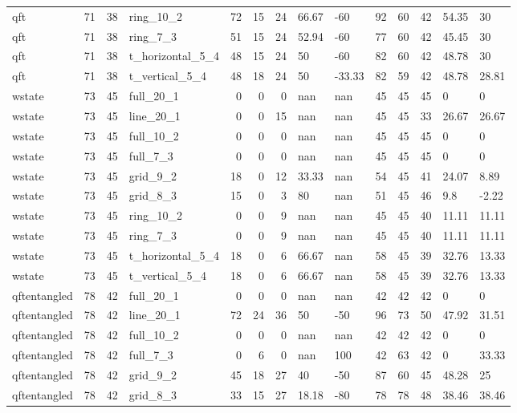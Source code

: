 \begin{longtable}{lrrlrrrllrrrll}
qft & 71 & 38 & ring\_10\_2 & 72 & 15 & 24 & 66.67 & -60 & 92 & 60 & 42 & 54.35 & 30 \\
qft & 71 & 38 & ring\_7\_3 & 51 & 15 & 24 & 52.94 & -60 & 77 & 60 & 42 & 45.45 & 30 \\
qft & 71 & 38 & t\_horizontal\_5\_4 & 48 & 15 & 24 & 50 & -60 & 82 & 60 & 42 & 48.78 & 30 \\
qft & 71 & 38 & t\_vertical\_5\_4 & 48 & 18 & 24 & 50 & -33.33 & 82 & 59 & 42 & 48.78 & 28.81 \\
wstate & 73 & 45 & full\_20\_1 & 0 & 0 & 0 & nan & nan & 45 & 45 & 45 & 0 & 0 \\
wstate & 73 & 45 & line\_20\_1 & 0 & 0 & 15 & nan & nan & 45 & 45 & 33 & 26.67 & 26.67 \\
wstate & 73 & 45 & full\_10\_2 & 0 & 0 & 0 & nan & nan & 45 & 45 & 45 & 0 & 0 \\
wstate & 73 & 45 & full\_7\_3 & 0 & 0 & 0 & nan & nan & 45 & 45 & 45 & 0 & 0 \\
wstate & 73 & 45 & grid\_9\_2 & 18 & 0 & 12 & 33.33 & nan & 54 & 45 & 41 & 24.07 & 8.89 \\
wstate & 73 & 45 & grid\_8\_3 & 15 & 0 & 3 & 80 & nan & 51 & 45 & 46 & 9.8 & -2.22 \\
wstate & 73 & 45 & ring\_10\_2 & 0 & 0 & 9 & nan & nan & 45 & 45 & 40 & 11.11 & 11.11 \\
wstate & 73 & 45 & ring\_7\_3 & 0 & 0 & 9 & nan & nan & 45 & 45 & 40 & 11.11 & 11.11 \\
wstate & 73 & 45 & t\_horizontal\_5\_4 & 18 & 0 & 6 & 66.67 & nan & 58 & 45 & 39 & 32.76 & 13.33 \\
wstate & 73 & 45 & t\_vertical\_5\_4 & 18 & 0 & 6 & 66.67 & nan & 58 & 45 & 39 & 32.76 & 13.33 \\
qftentangled & 78 & 42 & full\_20\_1 & 0 & 0 & 0 & nan & nan & 42 & 42 & 42 & 0 & 0 \\
qftentangled & 78 & 42 & line\_20\_1 & 72 & 24 & 36 & 50 & -50 & 96 & 73 & 50 & 47.92 & 31.51 \\
qftentangled & 78 & 42 & full\_10\_2 & 0 & 0 & 0 & nan & nan & 42 & 42 & 42 & 0 & 0 \\
qftentangled & 78 & 42 & full\_7\_3 & 0 & 6 & 0 & nan & 100 & 42 & 63 & 42 & 0 & 33.33 \\
qftentangled & 78 & 42 & grid\_9\_2 & 45 & 18 & 27 & 40 & -50 & 87 & 60 & 45 & 48.28 & 25 \\
qftentangled & 78 & 42 & grid\_8\_3 & 33 & 15 & 27 & 18.18 & -80 & 78 & 78 & 48 & 38.46 & 38.46 \\

\end{longtable}
